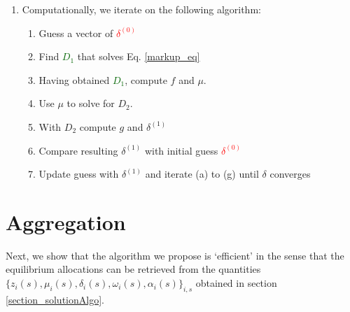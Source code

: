 \documentclass[12pt]{article}%
\begin{document}
\begin{enumerate}
    \item Computationally, we iterate on the following algorithm:
    \begin{enumerate}
        \item Guess a vector of \textcolor{red}{$\delta^{(0)}$}
        \item Find \textcolor{darkgreen}{$D_1$} that solves Eq. \eqref{markup_eq}
        
        \item Having obtained \textcolor{darkgreen}{$D_1$}, compute $f$ and  $\mu$.
        
        \item Use $\mu$ to solve for \textcolor{melon}{$D_2$}. 
        
        \item With \textcolor{melon}{$D_2$} compute $g$ and $\delta^{(1)}$
        
        \item Compare resulting $\delta^{(1)}$ with initial guess \textcolor{red}{$\delta^{(0)}$} 
        
        \item Update guess with $\delta^{(1)}$  and iterate (a) to (g) until $\delta$ converges    
    \end{enumerate}
\end{enumerate}

\section{Aggregation}
Next, we show that the algorithm we propose is `efficient' in the sense that the equilibrium allocations can be retrieved from the quantities $\{z_i(s), \mu_i(s), \delta_i(s), \omega_i(s), \alpha_i(s)\}_{i,s}$ obtained in section \ref{section_solutionAlgo}.
\end{document}
